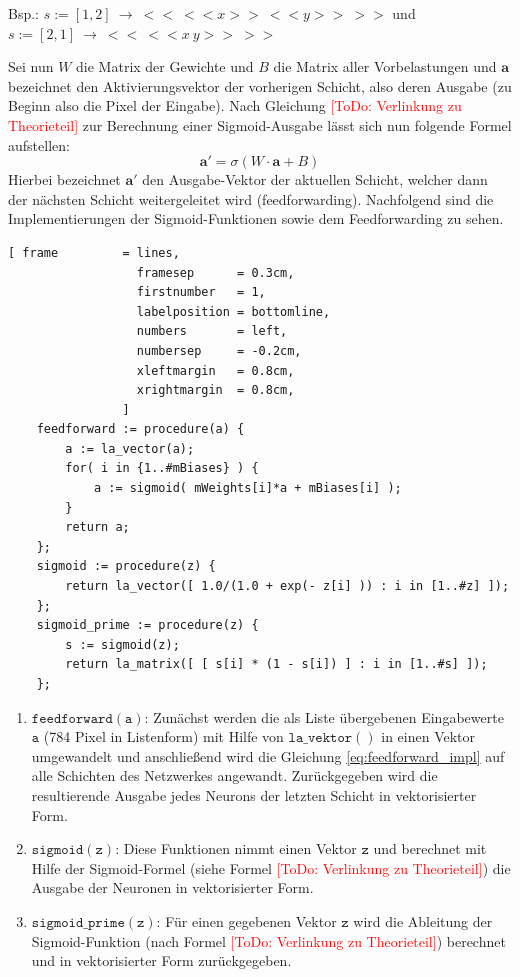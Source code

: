\begin{enumerate}
Bsp.: $s := [1,2]\ \rightarrow\ <<\ <<x>>\ <<y>>\ >>$ und $s := [2,1]\ \rightarrow\ <<\ <<x\ y>>\ >>$
\end{enumerate}

\noindent
Sei nun $W$ die Matrix der Gewichte und $B$ die Matrix aller Vorbelastungen und $\mathbf{a}$ bezeichnet den Aktivierungsvektor der vorherigen Schicht, also deren Ausgabe (zu Beginn also die Pixel der Eingabe). Nach Gleichung \textcolor{red}{[ToDo: Verlinkung zu Theorieteil]} zur Berechnung einer Sigmoid-Ausgabe lässt sich nun folgende Formel aufstellen: 
\begin{equation}\label{eq:feedforward_impl}
	\mathbf{a}' = \sigma(W\cdot \mathbf{a} + B)
\end{equation}
\noindent
Hierbei bezeichnet $\mathbf{a}'$ den Ausgabe-Vektor der aktuellen Schicht, welcher dann der nächsten Schicht weitergeleitet wird (feedforwarding). Nachfolgend sind die Implementierungen der Sigmoid-Funktionen sowie dem Feedforwarding zu sehen.
\begin{Verbatim}[ frame         = lines, 
                  framesep      = 0.3cm, 
                  firstnumber   = 1,
                  labelposition = bottomline,
                  numbers       = left,
                  numbersep     = -0.2cm,
                  xleftmargin   = 0.8cm,
                  xrightmargin  = 0.8cm,
                ]
    feedforward := procedure(a) {
        a := la_vector(a);	
        for( i in {1..#mBiases} ) { 
            a := sigmoid( mWeights[i]*a + mBiases[i] );
        }
        return a;
    };                            
    sigmoid := procedure(z) {
        return la_vector([ 1.0/(1.0 + exp(- z[i] )) : i in [1..#z] ]);
    };
    sigmoid_prime := procedure(z) {
        s := sigmoid(z); 
        return la_matrix([ [ s[i] * (1 - s[i]) ] : i in [1..#s] ]);
    };
\end{Verbatim}
\begin{enumerate}
\item $\mathtt{feedforward(a)}$: Zunächst werden die als Liste übergebenen Eingabewerte $\mathtt{a}$ (784 Pixel in Listenform) mit Hilfe von $\mathtt{la\_vektor()}$ in einen Vektor umgewandelt und anschließend wird die Gleichung \eqref{eq:feedforward_impl} auf alle Schichten des Netzwerkes angewandt. Zurückgegeben wird die resultierende Ausgabe jedes Neurons der letzten Schicht in vektorisierter Form.
\item $\mathtt{sigmoid(z)}$: Diese Funktionen nimmt einen Vektor $\mathtt{z}$ und berechnet mit Hilfe der Sigmoid-Formel (siehe Formel \textcolor{red}{[ToDo: Verlinkung zu Theorieteil]}) die Ausgabe der Neuronen in vektorisierter Form.
\item $\mathtt{sigmoid\_prime(z)}$: Für einen gegebenen Vektor $\mathtt{z}$ wird die Ableitung der Sigmoid-Funktion (nach Formel \textcolor{red}{[ToDo: Verlinkung zu Theorieteil]}) berechnet und in vektorisierter Form zurückgegeben.
\end{enumerate}
